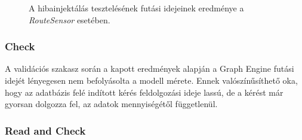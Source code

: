 \pagebreak
\begin{figure}[H]
	\centering
	\vspace*{-2cm}
	\caption{A hibainjektálás tesztelésének futási idejeinek eredménye a \emph{RouteSensor} esetében.}
	\label{fig:RouteSensorInjectResult}
\end{figure}

\subsubsection{Check}

A validációs szakasz során a kapott eredmények alapján a Graph Engine futási idejét lényegesen nem befolyásolta a modell mérete. Ennek valószínűsíthető oka, hogy az adatbázis felé indított kérés feldolgozási ideje lassú, de a kérést már gyorsan dolgozza fel, az adatok mennyiségétől függetlenül.

\subsubsection{Read and Check}

